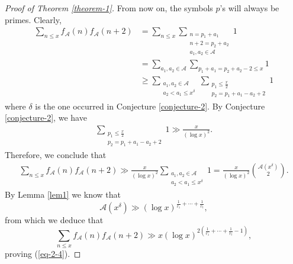 \documentclass[10pt,a4paper]{amsart}
\begin{document}
\begin{proof}[Proof of Theorem \ref{theorem-1}]
From now on, the symbols $p$'s will always be primes. Clearly,
\begin{align*}
\sum_{n\le x} f_{\mathcal{A}}(n)f_{\mathcal{A}}(n+2)&=\sum_{n\le x}\sum_{\substack{n=p_1+a_1\\ n+2=p_2+a_2\\ a_1, a_2\in \mathcal{A}}}1\\
&=\sum_{a_1, a_2\in \mathcal{A}}\sum_{p_1+a_1=p_2+a_2-2\le x}1\\
&\ge \sum_{\substack{a_1, a_2\in \mathcal{A}\\a_2<a_1\le x^\delta}}\sum_{\substack{p_1\le \frac{x}{2}\\ p_2=p_1+a_1-a_2+2}}1
\end{align*}
where $\delta$ is the one occurred in Conjecture \ref{conjecture-2}. By Conjecture \ref{conjecture-2}, we have
\begin{align*}
\sum_{\substack{p_1\le \frac{x}{2}\\ p_2=p_1+a_1-a_2+2}}1\gg \frac{x}{(\log x)^2}.
\end{align*}
Therefore, we conclude that
\begin{align*}
\sum_{n\le x} f_{\mathcal{A}}(n)f_{\mathcal{A}}(n+2)\gg \frac{x}{(\log x)^2}\sum_{\substack{a_1, a_2\in \mathcal{A}\\a_2<a_1\le x^\delta}}1=\frac{x}{(\log x)^2}\binom{\mathcal{A}\left(x^\delta\right)}{2}.
\end{align*}
By Lemma \ref{lem1} we know that
$$
\mathcal{A}\left(x^\delta\right)\gg (\log x)^{\frac{1}{r_1}+\cdots+\frac{1}{r_t}},
$$
from which we deduce that
$$
\sum_{n\le x} f_{\mathcal{A}}(n)f_{\mathcal{A}}(n+2)\gg x(\log x)^{2\left(\frac{1}{r_1}+\cdots+\frac{1}{r_t}-1\right)},
$$
proving (\ref{eq-2-4}).
\end{proof}
\end{document}
